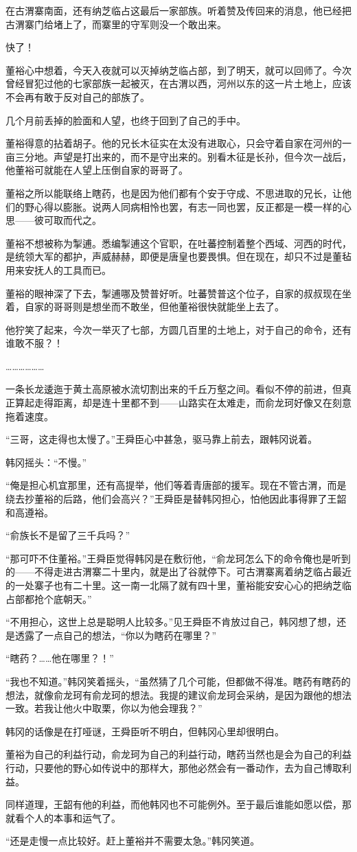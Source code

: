 在古渭寨南面，还有纳芝临占这最后一家部族。听着赞及传回来的消息，他已经把古渭寨门给堵上了，而寨里的守军则没一个敢出来。

快了！

董裕心中想着，今天入夜就可以灭掉纳芝临占部，到了明天，就可以回师了。今次曾经冒犯过他的七家部族一起被灭，在古渭以西，河州以东的这一片土地上，应该不会再有敢于反对自己的部族了。

几个月前丢掉的脸面和人望，也终于回到了自己的手中。

董裕得意的拈着胡子。他的兄长木征实在太没有进取心，只会守着自家在河州的一亩三分地。声望是打出来的，而不是守出来的。别看木征是长孙，但今次一战后，他董裕可就能在人望上压倒自家的哥哥了。

董裕之所以能联络上瞎药，也是因为他们都有个安于守成、不思进取的兄长，让他们的野心得以膨胀。说两人同病相怜也罢，有志一同也罢，反正都是一模一样的心思——彼可取而代之。

董裕不想被称为掣逋。悉编掣逋这个官职，在吐蕃控制着整个西域、河西的时代，是统领大军的都护，声威赫赫，即便是唐皇也要畏惧。但在现在，却只不过是董毡用来安抚人的工具而已。

董裕的眼神深了下去，掣逋哪及赞普好听。吐蕃赞普这个位子，自家的叔叔现在坐着，自家的哥哥则是想坐而不敢坐，但他董裕很快就能坐上去了。

他狞笑了起来，今次一举灭了七部，方圆几百里的土地上，对于自己的命令，还有谁敢不服？！

………………

一条长龙逶迤于黄土高原被水流切割出来的千丘万壑之间。看似不停的前进，但真正算起走得距离，却是连十里都不到——山路实在太难走，而俞龙珂好像又在刻意拖着速度。

“三哥，这走得也太慢了。”王舜臣心中甚急，驱马靠上前去，跟韩冈说着。

韩冈摇头：“不慢。”

“俺是担心机宜那里，还有高提举，他们等着青唐部的援军。现在不管古渭，而是绕去抄董裕的后路，他们会高兴？”王舜臣是替韩冈担心，怕他因此事得罪了王韶和高遵裕。

“俞族长不是留了三千兵吗？”

“那可吓不住董裕。”王舜臣觉得韩冈是在敷衍他，“俞龙珂怎么下的命令俺也是听到的——不得走进古渭寨二十里内，就是出了谷就停下。可古渭寨离着纳芝临占最近的一处寨子也有二十里。这一南一北隔了就有四十里，董裕能安安心心的把纳芝临占部都抢个底朝天。”

“不用担心，这世上总是聪明人比较多。”见王舜臣不肯放过自己，韩冈想了想，还是透露了一点自己的想法，“你以为瞎药在哪里？”

“瞎药？……他在哪里？！”

“我也不知道。”韩冈笑着摇头，“虽然猜了几个可能，但都做不得准。瞎药有瞎药的想法，就像俞龙珂有俞龙珂的想法。我提的建议俞龙珂会采纳，是因为跟他的想法一致。若我让他火中取栗，你以为他会理我？”

韩冈的话像是在打哑谜，王舜臣听不明白，但韩冈心里却很明白。

董裕为自己的利益行动，俞龙珂为自己的利益行动，瞎药当然也是会为自己的利益行动，只要他的野心如传说中的那样大，那他必然会有一番动作，去为自己博取利益。

同样道理，王韶有他的利益，而他韩冈也不可能例外。至于最后谁能如愿以偿，那就看个人的本事和运气了。

“还是走慢一点比较好。赶上董裕并不需要太急。”韩冈笑道。

